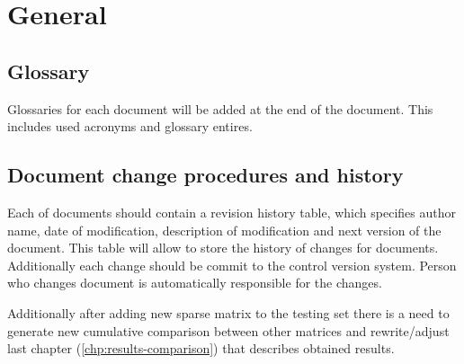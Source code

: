 \chapter{General} \label{chp:general}
	\begin{comment}
		Introduce the following subordinate sections. This section includes the Glossary and document change
		procedures.
	\end{comment}

\section{Glossary} \label{s:general:glossary}
	\begin{comment}
		Provide an alphabetical list of terms that may require definition for the users of the MTP with their
		corresponding definitions. This includes acronyms. There may also be a reference to a project glossary,
		possibly posted online.
	\end{comment}
	Glossaries for each document will be added at the end of the document. This includes used acronyms and glossary entires.
\section{Document change procedures and history} \label{s:general:document-change-procedures-and-history}
	\begin{comment}
		Specify the means for identifying, approving, implementing, and recording changes to the MTP. This
		may be recorded in an overall configuration management system that is documented in a Configuration
		Management Plan that is referenced here. The change procedures need to include a log of all of the
		changes that have occurred since the inception of the MTP. This may include a Document ID (every
		testing document should have a unique ID connected to the system project), version number
		(sequential starting with first approved version), description of document changes, reason for changes
		(e.g., audit comments, team review, system changes), name of person making changes, and role of
		person to document (e.g., document author, project manager, system owner). This information is
		commonly put on an early page in the document (after the title page and before Section 1). Some
		organizations put this information at the end of the document.
	\end{comment}
	
	Each of documents should contain a revision history table, which specifies author name, date of modification, description of modification and next version of the document. This table will allow to store the history of changes for documents. Additionally each change should be commit to the control version system. Person who changes document is automatically responsible for the changes.
	
	Additionally after adding new sparse matrix to the testing set there is a need to generate new cumulative comparison between other matrices and rewrite/adjust last chapter (\ref{chp:results-comparison}) that describes obtained results. 